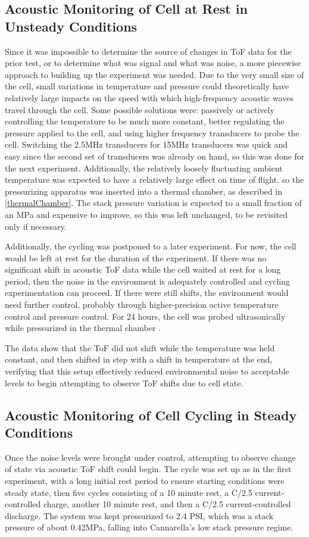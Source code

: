 \subsection{Acoustic Monitoring of Cell at Rest in Unsteady Conditions}\label{chamberTest}
Since it was impossible to determine the source of changes in ToF data for the prior test, or to determine what was signal and what was noise, a more piecewise approach to building up the experiment was needed. Due to the very small size of the cell, small variations in temperature and pressure could theoretically have relatively large impacts on the speed with which high-frequency acoustic waves travel through the cell. Some possible solutions were: passively or actively controlling the temperature to be much more constant, better regulating the pressure applied to the cell, and using higher frequency transducers to probe the cell. Switching the 2.5MHz transducers for 15MHz transducers was quick and easy since the second set of transducers was already on hand, so this was done for the next experiment. Additionally, the relatively loosely fluctuating ambient temperature was expected to have a relatively large effect on time of flight, so the pressurizing apparatus was inserted into a thermal chamber, as described in \hyperref[thermalChamber]{\cref{thermalChamber}}. The stack pressure variation is expected to a small fraction of an MPa and expensive to improve, so this was left unchanged, to be revisited only if necessary.

Additionally, the cycling was postponed to a later experiment.
For now, the cell would be left at rest for the duration of the experiment. 
If there was no significant shift in acoustic ToF data while the cell waited at rest for a long period, then the noise in the environment is adequately controlled and cycling experimentation can proceed. 
If there were still shifts, the environment would need further control, probably through higher-precision active temperature control and pressure control. 
For 24 hours, the cell was probed ultrasonically while pressurized in the thermal chamber .

The data show that the ToF did not shift while the temperature was held constant, and then shifted in step with a shift in temperature at the end, verifying that this setup effectively reduced environmental noise to acceptable levels to begin attempting to observe ToF shifts due to cell state.

\subsection{Acoustic Monitoring of Cell Cycling in Steady Conditions}
Once the noise levels were brought under control, attempting to observe change of state via acoustic ToF shift could begin. The cycle was set up as in the first experiment, with a long initial rest period to ensure starting conditions were steady state, then five cycles consisting of a 10 minute rest, a C/2.5 current-controlled charge, another 10 minute rest, and then a C/2.5 current-controlled discharge. 
The system was kept pressurized to 2.4 PSI, which was a stack pressure of about 0.42MPa, falling into Cannarella's low stack pressure regime.


